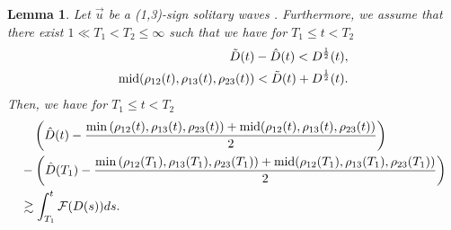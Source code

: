 \documentclass[reqno]{amsart}
\theoremstyle{plain}
\newtheorem{lemma}[theorem]{Lemma}
\theoremstyle{definition}
\numberwithin{equation}{section}
\newcommand{\m}{\mbox{\textnormal{mid}}}
\newcommand{\1}{\mathbbm{1}}
\begin{document}
\begin{lemma}\label{henchoumid2}
Let $\vec{u}$ be a (1,3)-sign solitary waves . Furthermore, we assume that there exist $1\ll T_1<T_2\leq \infty$ such that we have for $T_1\leq t<T_2$
\begin{align}
\tilde{D}(t)-\hat{D}(t)<D^{\frac{1}{2}}(t), \label{lemass01251}
\\
\m{(\rho_{12}(t),\rho_{13}(t),\rho_{23}(t))}<\tilde{D}(t)+D^{\frac{1}{2}}(t). \label{lemass01252}
\end{align}
Then, we have for $T_1\leq t<T_2$
\begin{align}
\begin{aligned}
&\quad \left(\hat{D}(t)-\frac{\min{(\rho_{12}(t),\rho_{13}(t),\rho_{23}(t))}+\m{(\rho_{12}(t),\rho_{13}(t),\rho_{23}(t))}}{2}\right)
\\
&-\left(\hat{D}(T_1)-\frac{\min{(\rho_{12}(T_1),\rho_{13}(T_1),\rho_{23}(T_1))}+\m{(\rho_{12}(T_1),\rho_{13}(T_1),\rho_{23}(T_1))}}{2}\right)
\\
&\gtrsim \int_{T_1}^t \mathcal{F}(D(s))ds.
\end{aligned}
\end{align}
\end{lemma}
\end{document}
